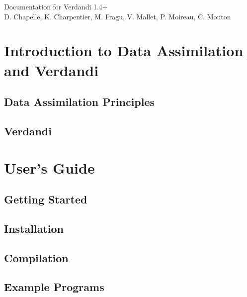 \documentclass{book}
\begin{document}
\hypersetup{pageanchor=false,citecolor=blue}
\begin{titlepage}
\vspace*{7cm}
\begin{center}
{\Large Documentation for Verdandi 1.4+}\\
\vspace*{1cm}
{\large D. Chapelle, K. Charpentier, M. Fragu, V. Mallet, P. Moireau, C. Mouton}\\
\end{center}
\end{titlepage}
\clearemptydoublepage
{}
\tableofcontents
\clearemptydoublepage
{}
\hypersetup{pageanchor=true,citecolor=blue}
\part{Introduction to Data Assimilation and Verdandi}
\chapter{Data Assimilation Principles}

\chapter{Verdandi}
\label{index}\hypertarget{index}{}
\part{User's Guide}
\chapter{Getting Started}
\label{getting_started}
\hypertarget{getting_started}{}

\chapter{Installation}
\label{installation}
\hypertarget{installation}{}

\chapter{Compilation}
\label{compilation}
\hypertarget{compilation}{}

\chapter{Example Programs}
\label{example_programs}
\hypertarget{example_programs}{}

\end{document}
